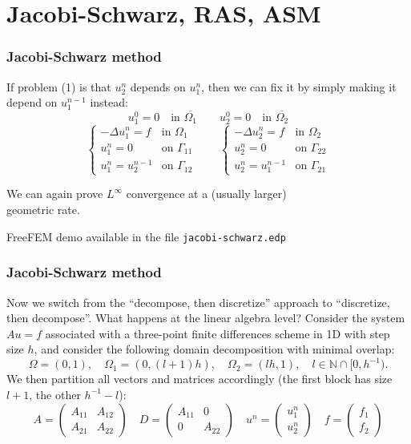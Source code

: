 \documentclass{beamer}
\begin{document}
\section{Jacobi-Schwarz, RAS, ASM}

\begin{frame}
\frametitle{Jacobi-Schwarz method}
If problem (1) is that $u_2^n$ depends on $u_1^n$, then we can fix it by
simply making it depend on $u_1^{n-1}$ instead:
\[
u_1^0 = 0 \quad \text{in } \overline{\Omega_1}
\qquad
u_2^0 = 0 \quad \text{in } \overline{\Omega_2}
\]
\[
\begin{cases}
	-\Delta u_1^n = f & \text{in $\Omega_1$} \\
	u_1^n = 0 & \text{on $\Gamma_{11}$} \\
	u_1^n = u_2^{n-1} & \text{on $\Gamma_{12}$}
\end{cases}
\qquad
\begin{cases}
	-\Delta u_2^n = f & \text{in $\Omega_2$} \\
	u_2^n = 0 & \text{on $\Gamma_{22}$} \\
	u_2^n = u_1^{n-1} & \text{on $\Gamma_{21}$}
\end{cases}
\]

We can again prove $L^\infty$ convergence at a (usually larger) \\ geometric rate.

FreeFEM demo available in the file \texttt{jacobi-schwarz.edp}
\end{frame}

\begin{frame}
\frametitle{Jacobi-Schwarz method}
Now we switch from the ``decompose, then discretize'' approach
to ``discretize, then decompose''. What happens at the linear algebra level?
Consider the system $Au = f$ associated with a
three-point finite differences scheme in 1D with step size $h$,
and consider the following domain decomposition with minimal overlap:
\[
\Omega = (0,1), \quad \Omega_1 = (0,(l+1)h),
\quad \Omega_2 = (lh,1), \quad l \in \mathbb{N} \cap [0,h^{-1}).
\]
We then partition all vectors and matrices accordingly (the first block
has size $l+1$, the other $h^{-1}-l$):
\[
A = \begin{pmatrix} A_{11} & A_{12} \\ A_{21} & A_{22} \end{pmatrix}
\quad
D = \begin{pmatrix} A_{11} & 0 \\ 0 & A_{22} \end{pmatrix}
\quad
u^n = \begin{pmatrix} u_1^n \\ u_2^n \end{pmatrix}
\quad
f = \begin{pmatrix} f_1 \\ f_2 \end{pmatrix}
\]
\end{frame}
\end{document}
